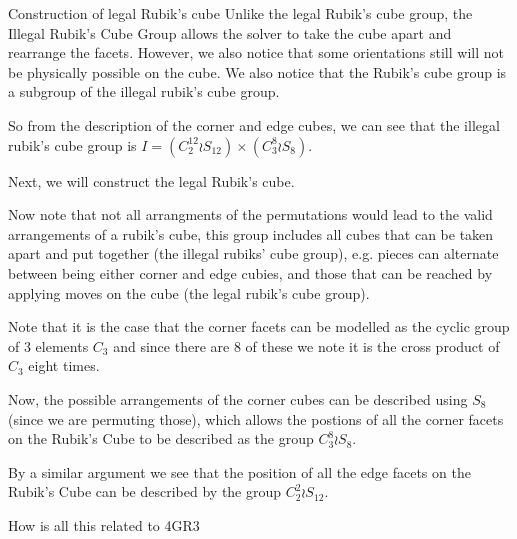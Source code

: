 \documentclass[final]{beamer}
\newlength{\colwidth}
\begin{document}
\begin{frame}[t]
\begin{columns}[t]
\begin{column}{\colwidth}
\begin{exampleblock}{Construction of legal Rubik's cube}
    Unlike the legal Rubik's cube group, the Illegal Rubik’s Cube Group allows the solver to take the cube apart and rearrange the facets.  However, we also notice that some orientations still will not be physically possible on the cube. We also notice that the Rubik's cube group is a subgroup of the illegal rubik's cube group.

    So from the description of the corner and edge cubes, we can see that the illegal rubik's cube group is $I = (C^{12}_2 \wr S_{12}) \times (C^8_3 \wr S_8)$.


    Next, we will construct the legal Rubik's cube.

    

Now note that not all arrangments of the permutations would lead to the valid arrangements of a rubik's cube, this group includes all cubes that can be taken apart and put together (the illegal rubiks' cube group), e.g. pieces can alternate between being either corner and edge cubies, and those that can be reached by applying moves on the cube (the legal rubik's cube group).

Note that it is the case that the corner facets can be modelled as the cyclic group of 3 elements $C_{3}$ and since there are 8 of these we note it is the cross product of $C_{3}$ eight times. 

Now, the possible arrangements of the corner cubes can be described using $S_{8}$ (since we are permuting those), which allows the postions of all the corner facets on the Rubik's Cube to be described as the group $C_{3}^{8} \wr S_{8}$.

By a similar argument we see that the  position of all the edge facets on the Rubik's Cube can be described by the group $C_{2}^{2} \wr S_{12}$.



    

    

  \end{exampleblock}

  \begin{block}{How is all this related to 4GR3}



\end{block}
\end{column}
\end{columns}
\end{frame}
\end{document}
